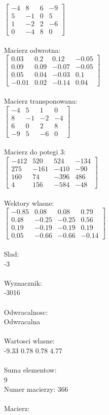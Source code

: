 \documentclass[a4paper,12pt]{article}
\begin{document}
$\begin{bmatrix} -4&8&6&-9\\5&-1&0&5\\1&-2&2&-6\\0&-4&8&0 \end{bmatrix}$
\\
\\
Macierz odwrotna:\\

$\begin{bmatrix} 0.03&0.2&0.12&-0.05\\0.09&0.09&-0.07&-0.05\\0.05&0.04&-0.03&0.1\\-0.01&0.02&-0.14&0.04 \end{bmatrix}$
\\
\\
Macierz transponowana:\\

$\begin{bmatrix} -4&5&1&0\\8&-1&-2&-4\\6&0&2&8\\-9&5&-6&0 \end{bmatrix}$
\\
\\
Macierz do potegi 3:\\

$\begin{bmatrix} -412&520&524&-134\\275&-161&-410&-90\\160&74&-396&486\\4&156&-584&-48 \end{bmatrix}$
\\
\\
Wektory wlasne:\\

$\begin{bmatrix} -0.85&0.08&0.08&0.79\\0.48&-0.25&-0.25&0.56\\0.19&-0.19&-0.19&0.19\\0.05&-0.66&-0.66&-0.14 \end{bmatrix}$
\\
\\
Slad:\\
-3
\\
\\
Wyznacznik:\\
-3016
\\
\\
Odwracalnosc:\\
Odwracalna
\\
\\
Wartosci wlasne:\\
-9.33 0.78 0.78 4.77
\\
\\
Suma elementow:\\
9
\\
\newpage
Numer macierzy:
366
\\
\\
Macierz:\\
\end{document}
